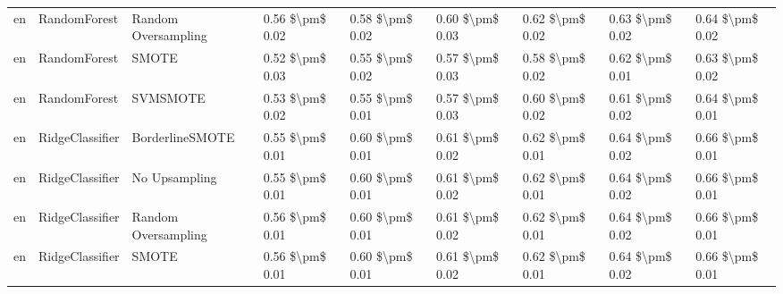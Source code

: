 \begin{tabular}{lllllllll}
      en &                    RandomForest &           Random Oversampling & 0.56 \$\textbackslash pm\$ 0.02 &           0.58 \$\textbackslash pm\$ 0.02 &       0.60 \$\textbackslash pm\$ 0.03 &        0.62 \$\textbackslash pm\$ 0.02 &                         0.63 \$\textbackslash pm\$ 0.02 &     0.64 \$\textbackslash pm\$ 0.02 \\
      en &                    RandomForest &                         SMOTE & 0.52 \$\textbackslash pm\$ 0.03 &           0.55 \$\textbackslash pm\$ 0.02 &       0.57 \$\textbackslash pm\$ 0.03 &        0.58 \$\textbackslash pm\$ 0.02 &                         0.62 \$\textbackslash pm\$ 0.01 &     0.63 \$\textbackslash pm\$ 0.02 \\
      en &                    RandomForest &                      SVMSMOTE & 0.53 \$\textbackslash pm\$ 0.02 &           0.55 \$\textbackslash pm\$ 0.01 &       0.57 \$\textbackslash pm\$ 0.03 &        0.60 \$\textbackslash pm\$ 0.02 &                         0.61 \$\textbackslash pm\$ 0.02 &     0.64 \$\textbackslash pm\$ 0.01 \\
      en &                 RidgeClassifier &               BorderlineSMOTE & 0.55 \$\textbackslash pm\$ 0.01 &           0.60 \$\textbackslash pm\$ 0.01 &       0.61 \$\textbackslash pm\$ 0.02 &        0.62 \$\textbackslash pm\$ 0.01 &                         0.64 \$\textbackslash pm\$ 0.02 &     0.66 \$\textbackslash pm\$ 0.01 \\
      en &                 RidgeClassifier &                 No Upsampling & 0.55 \$\textbackslash pm\$ 0.01 &           0.60 \$\textbackslash pm\$ 0.01 &       0.61 \$\textbackslash pm\$ 0.02 &        0.62 \$\textbackslash pm\$ 0.01 &                         0.64 \$\textbackslash pm\$ 0.02 &     0.66 \$\textbackslash pm\$ 0.01 \\
      en &                 RidgeClassifier &           Random Oversampling & 0.56 \$\textbackslash pm\$ 0.01 &           0.60 \$\textbackslash pm\$ 0.01 &       0.61 \$\textbackslash pm\$ 0.02 &        0.62 \$\textbackslash pm\$ 0.01 &                         0.64 \$\textbackslash pm\$ 0.02 &     0.66 \$\textbackslash pm\$ 0.01 \\
      en &                 RidgeClassifier &                         SMOTE & 0.56 \$\textbackslash pm\$ 0.01 &           0.60 \$\textbackslash pm\$ 0.01 &       0.61 \$\textbackslash pm\$ 0.02 &        0.62 \$\textbackslash pm\$ 0.01 &                         0.64 \$\textbackslash pm\$ 0.02 &     0.66 \$\textbackslash pm\$ 0.01 \\

\end{tabular}

